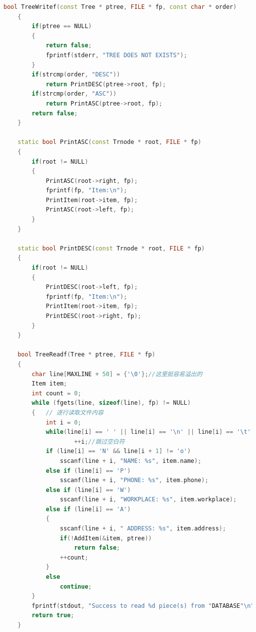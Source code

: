 \documentclass[12pt, a4paper, oneside]{ctexart}
\begin{document}
\begin{framed}
\begin{lstlisting}[language=C++]
    bool TreeWritef(const Tree * ptree, FILE * fp, const char * order)
    {
        if(ptree == NULL)
        {
            return false;
            fprintf(stderr, "TREE DOES NOT EXISTS");
        }
        if(strcmp(order, "DESC"))
            return PrintDESC(ptree->root, fp);
        if(strcmp(order, "ASC"))
            return PrintASC(ptree->root, fp);
        return false;
    }
    
    static bool PrintASC(const Trnode * root, FILE * fp)
    {   
        if(root != NULL)
        {
            PrintASC(root->right, fp);
            fprintf(fp, "Item:\n");
            PrintItem(root->item, fp);
            PrintASC(root->left, fp);
        }
    }
    
    static bool PrintDESC(const Trnode * root, FILE * fp)
    {   
        if(root != NULL)
        {
            PrintDESC(root->left, fp);
            fprintf(fp, "Item:\n");
            PrintItem(root->item, fp);
            PrintDESC(root->right, fp);
        }
    }

    bool TreeReadf(Tree * ptree, FILE * fp) 
    {
        char line[MAXLINE + 50] = {'\0'};//这里挺容易溢出的
        Item item;
        int count = 0;
        while (fgets(line, sizeof(line), fp) != NULL) 
        {   // 逐行读取文件内容
            int i = 0;
            while(line[i] == ' ' || line[i] == '\n' || line[i] == '\t')
                    ++i;//跳过空白符
            if (line[i] == 'N' && line[i + 1] != 'o')
                sscanf(line + i, "NAME: %s", item.name); 
            else if (line[i] == 'P') 
                sscanf(line + i, "PHONE: %s", item.phone); 
            else if (line[i] == 'W')
                sscanf(line + i, "WORKPLACE: %s", item.workplace);
            else if (line[i] == 'A')
            {
                sscanf(line + i, " ADDRESS: %s", item.address); 
                if(!AddItem(&item, ptree))
                    return false;
                ++count;
            }
            else
                continue;
        }
        fprintf(stdout, "Success to read %d piece(s) from "DATABASE"\n", count);
        return true;
    }
    

\end{lstlisting}
\end{framed}
\end{document}
